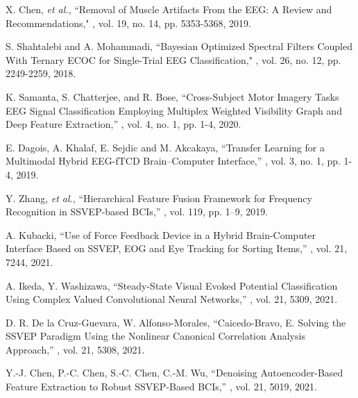 \documentclass[sensors,accept,moreauthors,pdftex,10pt,a4paper]{mdpi}
\theoremstyle{mdpi}
\newcounter{ex}
\newcounter{re}
\theoremstyle{mdpidefinition}
\begin{document}
\begin{thebibliography}{10}

X. Chen, \textit{et al.},
\newblock ``Removal of Muscle Artifacts From the EEG: A Review and Recommendations,"
, vol. 19, no. 14, pp. 5353-5368, 2019.

S. Shahtalebi and A. Mohammadi,
\newblock ``Bayesian Optimized Spectral Filters Coupled With Ternary ECOC for Single-Trial EEG Classification,"
, vol. 26, no. 12, pp. 2249-2259,  2018.

K. Samanta, S. Chatterjee, and R. Bose, \newblock ``Cross-Subject Motor Imagery Tasks EEG Signal Classification Employing Multiplex Weighted Visibility Graph and Deep Feature Extraction,'' , vol. 4, no. 1, pp. 1-4, 2020.

E. Dagois, A. Khalaf, E. Sejdic and M. Akcakaya,  \newblock ``Transfer Learning for a Multimodal Hybrid EEG-fTCD Brain–Computer Interface,'' , vol. 3, no. 1, pp. 1-4, 2019.

Y. Zhang, \textit{et al.},
\newblock ``Hierarchical Feature Fusion Framework for Frequency Recognition in SSVEP-based BCIs,''
,  vol. 119, pp. 1--9, 2019.

A. Kubacki,
\newblock ``Use of Force Feedback Device in a Hybrid Brain-Computer Interface Based on SSVEP, EOG and Eye Tracking for Sorting Items,''
, vol. 21, 7244, 2021.

A. Ikeda, Y. Washizawa,
\newblock ``Steady-State Visual Evoked Potential Classification Using Complex Valued Convolutional Neural Networks,''
, vol. 21, 5309, 2021.

D. R. De la Cruz-Guevara, W. Alfonso-Morales,
\newblock ``Caicedo-Bravo, E. Solving the SSVEP Paradigm Using the Nonlinear Canonical Correlation Analysis Approach,''
, vol. 21, 5308, 2021.

Y.-J. Chen, P.-C. Chen, S.-C. Chen, C.-M. Wu,
\newblock ``Denoising Autoencoder-Based Feature Extraction to Robust SSVEP-Based BCIs,''
, vol. 21, 5019, 2021.


\end{thebibliography}
\end{document}
